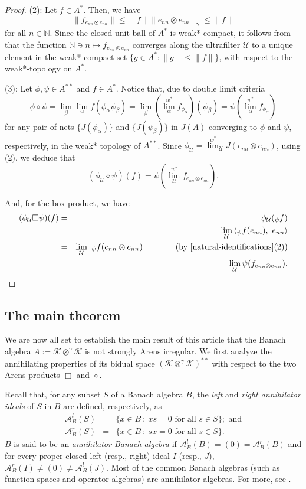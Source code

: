 \documentclass[a4]{amsart}
\theoremstyle{cupthm}
\theoremstyle{cupdefn}
\theoremstyle{cuprem}
\numberwithin{equation}{section}
\newcommand{\obp}{\otimes^{\gamma}}
\newcommand{\N}{\mathbb N}
\newcommand{\mK}{\mathcal{K}}
\newcommand{\mU}{\mathcal{U}}
\begin{document}
\begin{proof}
(2): Let $f \in A^*$. Then,  we have
\[
\|f_{e_{nn} \otimes e_{nn}}\| \leq \|f\|\|
e_{nn}\otimes e_{nn}\|_{\gamma} \leq \|f\|
\]
for all $n\in \N$.  Since the closed unit ball of $A^*$ is
weak*-compact, it follows from  that the
function $\N\ni n \mapsto f_{e_{nn}\otimes e_{nn}}$ converges along
the ultrafilter $\mU$ to a unique element in the weak*-compact set
$\{g \in A^*: \|g\| \leq \|f\|\}$, with respect to the weak*-topology
on $A^*$.\smallskip

(3): Let $\phi, \psi \in A^{**}$ and $f\in A^*$.  Notice
that, due to double limit criteria $$\phi\diamond
\psi=\lim_{\beta}\lim_{\alpha}f(\phi_\alpha\psi_\beta)=\lim_\beta
\left(\overset{w^*}{\lim_\alpha}
f_{\phi_\alpha}\right)(\psi_\beta)=\psi(\overset{w^*}{\lim_\alpha}
f_{\phi_\alpha})$$ for any pair of nets $\{J(\phi_\alpha)\}$ and
$\{J(\psi_\beta)\}$ in $J(A)$ converging to $\phi$ and $\psi$, respectively, in the
weak* topology of $A^{**}$. Since $\phi_{\mathcal
  U}=\overset{w^*}{\lim}_{\mathcal U} J(e_{nn}\otimes e_{nn})$, using 
(2), we deduce that
\[
(\phi_{\mathcal U}\diamond
\psi)(f)=\psi\left(\overset{w^*}{\lim_{\mathcal U}}f_{ e_{nn}\otimes
  e_{nn}}\right).
\]


And, for the box product, we have
\begin{eqnarray*}
(\phi_{\mathcal U}\Box \psi)(f)& =&\phi_{\mathcal U}(_\psi f)\\ &
  =&\lim_{\mathcal U}\left<_\psi f(e_{nn}),~
  e_{nn}\right>\\ &=&\lim_{\mathcal U}~_\psi f(e_{nn}\otimes e_{nn})
  \qquad \qquad \text{(by \Cref{natural-identifications}(2))}\\ & =&
  \lim_{\mathcal U}\psi(f_{ e_{nn} \otimes e_{nn}}).
\end{eqnarray*}

\end{proof}
\subsection{The main theorem}
We are now all set to establish the main result of this article that
the Banach algebra $A:=\mK \obp \mK$ is not strongly Arens
irregular. We first analyze the annihilating properties of its bidual
space $(\mK \obp \mK)^{**}$ with respect to the two Arens products
$\Box$ and $\diamond$.

Recall that, for any subset $S$ of a Banach algebra $B$, the {\em left} and {\em right
annihilator ideals} of $S$ in $B$ are defined, respectively, as
\[\begin{array}{rcl}
\mathcal{A}^l_B(S)& = & \{x\in
  B~:~xs=0 \text{ for all } s\in
  S\}; \text{ and}\\ \mathcal{A}^r_B(S)&= &\{x\in
  B~:~sx=0 \text{ for all } s\in S\}.
\end{array}
\]
$B$ is said to be an {\em annihilator Banach algebra} if
$\mathcal{A}^l_B(B)= (0) = \mathcal{A}^r_B(B)$ and for every proper
closed left (resp., right) ideal $I$ (resp., $J$), $\mathcal{A}^r_B(I)
\neq (0 ) \neq \mathcal{A}^l_B(J)$. Most of the common Banach algebras
(such as function spaces and operator algebras) are annihilator
algebras. For more, see \cite{Palmer, Rickart}.\smallskip
\end{document}
